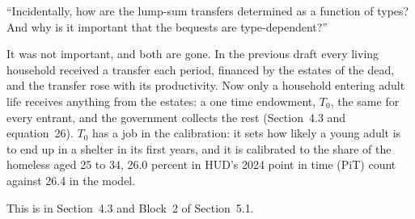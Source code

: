 \documentclass[11pt]{article}
\begin{document}
\begin{referee}
``Incidentally, how are the lump-sum transfers determined as a function of types?
And why is it important that the bequests are type-dependent?''
\end{referee}
\begin{response}
\concede It was not important, and both are gone. In the previous draft every
living household received a transfer each period, financed by the estates of the
dead, and the transfer rose with its productivity. Now only a household entering
adult life receives anything from the estates: a one time endowment, $T_0$, the
same for every entrant, and the government collects the rest (Section~4.3 and
equation~26). $T_0$ has a job in the calibration: it sets how likely a young adult
is to end up in a shelter in its first years, and it is calibrated to the share of
the homeless aged 25 to 34, 26.0 percent in HUD's 2024 point in time (PiT) count
against 26.4 in the model.

This is in Section~4.3 and Block~2 of Section~5.1.
\end{response}
\end{document}
